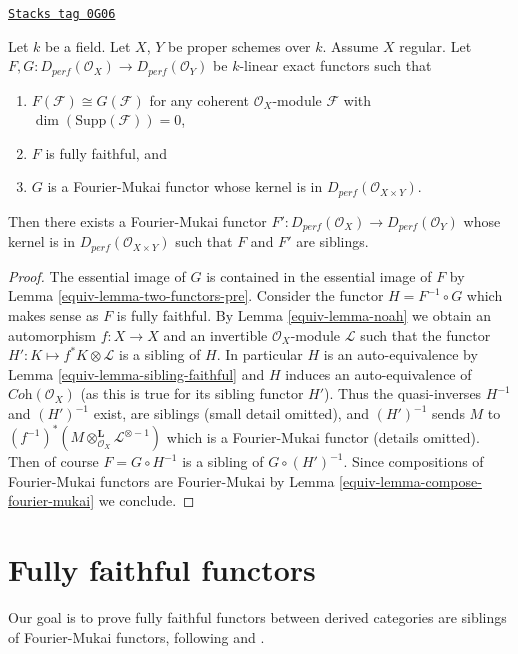 \begin{lemma}
\label{equiv-lemma-two-functors}
\href{https://stacks.math.columbia.edu/tag/0G06}{\texttt{Stacks tag 0G06}}

Let $k$ be a field. Let $X$, $Y$ be proper schemes over $k$.
Assume $X$ regular.
Let $F, G : D_{perf}(\mathcal{O}_X) \to D_{perf}(\mathcal{O}_Y)$
be $k$-linear exact functors such that
\begin{enumerate}
\item $F(\mathcal{F}) \cong G(\mathcal{F})$ for any coherent
$\mathcal{O}_X$-module $\mathcal{F}$ with $\dim(\text{Supp}(\mathcal{F})) = 0$,
\item $F$ is fully faithful, and
\item $G$ is a Fourier-Mukai functor whose kernel is in
$D_{perf}(\mathcal{O}_{X \times Y})$.
\end{enumerate}
Then there exists a Fourier-Mukai functor
$F' : D_{perf}(\mathcal{O}_X) \to D_{perf}(\mathcal{O}_Y)$
whose kernel is in $D_{perf}(\mathcal{O}_{X \times Y})$
such that $F$ and $F'$ are siblings.
\end{lemma}

\begin{proof}

The essential image of $G$ is contained in the essential
image of $F$ by Lemma \ref{equiv-lemma-two-functors-pre}.
Consider the functor $H = F^{-1} \circ G$
which makes sense as $F$ is fully faithful.
By Lemma \ref{equiv-lemma-noah} we obtain an automorphism $f : X \to X$
and an invertible $\mathcal{O}_X$-module $\mathcal{L}$ such that
the functor $H' : K \mapsto f^*K \otimes \mathcal{L}$
is a sibling of $H$. In particular
$H$ is an auto-equivalence by Lemma \ref{equiv-lemma-sibling-faithful}
and $H$ induces an auto-equivalence of
$\textit{Coh}(\mathcal{O}_X)$ (as this is true for its sibling functor $H'$).
Thus the quasi-inverses $H^{-1}$ and $(H')^{-1}$ exist, are siblings
(small detail omitted), and $(H')^{-1}$ sends $M$ to
$(f^{-1})^*(M \otimes_{\mathcal{O}_X}^\mathbf{L} \mathcal{L}^{\otimes -1})$
which is a Fourier-Mukai functor (details omitted).
Then of course $F = G \circ H^{-1}$ is a sibling of
$G \circ (H')^{-1}$. Since compositions of Fourier-Mukai
functors are Fourier-Mukai by
Lemma \ref{equiv-lemma-compose-fourier-mukai}
we conclude.
\end{proof}

\section{Fully faithful functors}
\label{equiv-section-fully-faithful}
Our goal is to prove fully faithful functors between derived categories
are siblings of Fourier-Mukai functors, following
\cite{Orlov-K3} and \cite{Ballard}.

